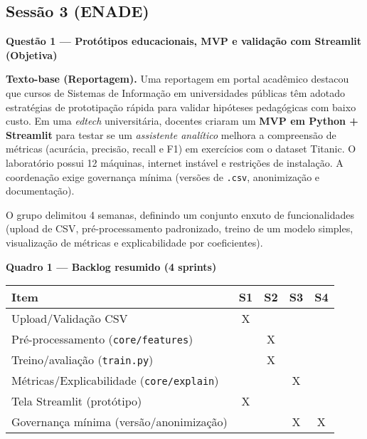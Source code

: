 \documentclass[12pt,a4paper]{article}
\begin{document}
\subsection*{Sessão 3 (ENADE)}
\noindent\textbf{Questão 1 — Protótipos educacionais, MVP e validação com Streamlit (Objetiva)}
\par\noindent\textbf{Texto-base (Reportagem).} Uma reportagem em portal acadêmico destacou que cursos de Sistemas de Informação em universidades públicas têm adotado estratégias de prototipação rápida para validar hipóteses pedagógicas com baixo custo. Em uma \textit{edtech} universitária, docentes criaram um \textbf{MVP em Python + Streamlit} para testar se um \emph{assistente analítico} melhora a compreensão de métricas (acurácia, precisão, recall e F1) em exercícios com o dataset Titanic. O laboratório possui 12 máquinas, internet instável e restrições de instalação. A coordenação exige governança mínima (versões de \texttt{.csv}, anonimização e documentação).
\par\noindent O grupo delimitou 4 semanas, definindo um conjunto enxuto de funcionalidades (upload de CSV, pré-processamento padronizado, treino de um modelo simples, visualização de métricas e explicabilidade por coeficientes).

\vspace{0.5em}
\noindent\textbf{Quadro 1 — Backlog resumido (4 sprints)}
\begin{center}
\begin{tabular}{lcccc}
\toprule
\textbf{Item} & \textbf{S1} & \textbf{S2} & \textbf{S3} & \textbf{S4}\\
\midrule
Upload/Validação CSV & X &  &  &  \\
Pré-processamento (\texttt{core/features}) &  & X &  &  \\
Treino/avaliação (\texttt{train.py}) &  & X &  &  \\
Métricas/Explicabilidade (\texttt{core/explain}) &  &  & X &  \\
Tela Streamlit (protótipo) & X &  &  &  \\
Governança mínima (versão/anonimização) &  &  & X & X \\
\bottomrule
\end{tabular}
\end{center}
\end{document}
